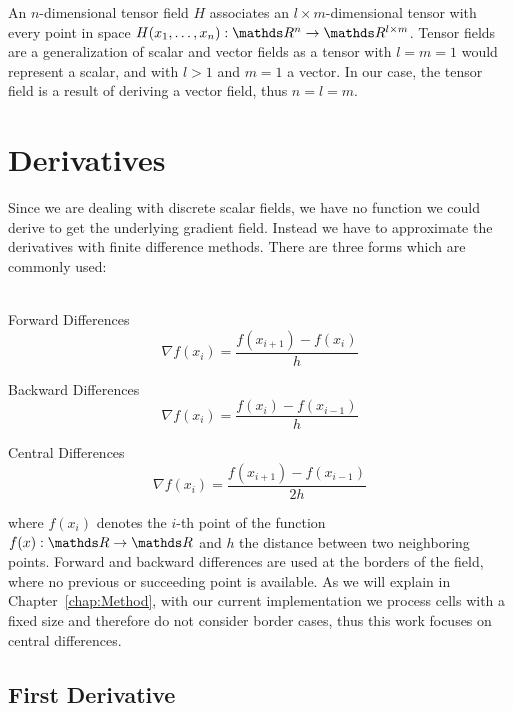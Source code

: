 An $n$-dimensional tensor field $H$ associates an $l \times
m$-dimensional tensor with every point in space $H(x_1,\dots,x_n):
\real^n \rightarrow \real^{l \times m}$. Tensor fields are a
generalization of scalar and vector fields as a tensor with $l = m = 1$
would represent a scalar, and with $l > 1$ and $m = 1$ a vector. In our
case, the tensor field is a result of deriving a vector field, thus $n =
l = m$.

\section{Derivatives}

Since we are dealing with discrete scalar fields, we have no function we
could derive to get the underlying gradient field. Instead we have to
approximate the derivatives with finite difference methods. There are
three forms which are commonly used:\\
\\
\begin{inparaenum}[(a)]
  \item Forward Differences
  \begin{equation}
    \nabla f(x_i) = \frac{f(x_{i+1}) - f(x_i)}{h}
  \end{equation}
  \item Backward Differences
  \begin{equation}
    \nabla f(x_i) = \frac{f(x_i) - f(x_{i-1})}{h}
  \end{equation}
  \item Central Differences
  \begin{equation} \label{eq:centDiff}
    \nabla f(x_i) = \frac{f(x_{i+1}) - f(x_{i-1})}{2h}
  \end{equation}
\end{inparaenum}
where $f(x_i)$ denotes the $i$-th point of the function $f(x): \real \rightarrow \real$
and $h$ the distance between two neighboring points. Forward and backward
differences are used at the borders of the field, where no previous or
succeeding point is available. As we will explain in Chapter~\ref{chap:Method},
with our current implementation we process cells with a fixed size and
therefore do not consider border cases, thus this work focuses on central
differences.

\subsection{First Derivative}

